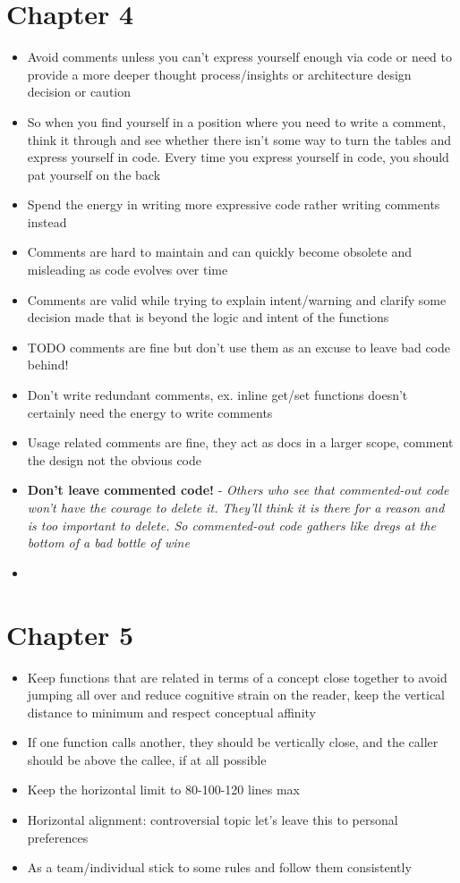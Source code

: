 \documentclass[14pt]{article}
\begin{document}
\section*{Chapter 4}
\begin{itemize}
	
	\item Avoid comments unless you can't express yourself enough via code or need to provide a more deeper thought process/insights or architecture design decision or caution
	\item So when you find yourself in a position where you need to write a comment, think it through and see whether there isn’t some way to turn the tables and express yourself in code. Every time you express yourself in code, you should pat yourself on the back
	\item Spend the energy in writing more expressive code rather writing comments instead
	\item Comments are hard to maintain and can quickly become obsolete and misleading as code evolves over time
	\item Comments are valid while trying to explain intent/warning and clarify some decision made that is beyond the logic and intent of the functions
	\item TODO comments are fine but don't use them as an excuse to leave bad code behind!
	\item Don't write redundant comments, ex. inline get/set functions doesn't certainly need the energy to write comments
	\item Usage related comments are fine, they act as docs in a larger scope, comment the design not the obvious code
	\item \textbf{Don't leave commented code!} - \textit{Others who see that commented-out code won’t have the courage to delete it. They’ll think it is there for a reason and is too important to delete. So commented-out code gathers like dregs at the bottom of a bad bottle of wine}
	\item 
	
\end{itemize}
\section*{Chapter 5}
\begin{itemize}

	\item Keep functions that are related in terms of a concept close together to avoid jumping all over and reduce cognitive strain on the reader, keep the vertical distance to minimum and respect conceptual affinity
	\item If one function calls another, they should be vertically close, and the caller should be above the callee, if at all possible
	\item Keep the horizontal limit to 80-100-120 lines max
	\item Horizontal alignment: controversial topic let's leave this to personal preferences
	\item As a team/individual stick to some rules and follow them consistently

\end{itemize}
\end{document}
